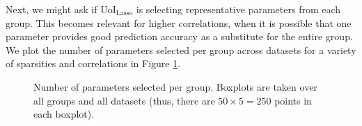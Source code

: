 \documentclass[11pt]{article}
\begin{document}
Next, we might ask if UoI$_{\text{Lasso}}$ is selecting representative parameters from each group. This becomes relevant for higher correlations, when it is possible that one parameter provides good prediction accuracy as a substitute for the entire group. We plot the number of parameters selected per group across datasets for a variety of sparsities and correlations in Figure \ref{fig:exp2-n-per-group}.
\begin{figure}[H]
	\centering
	\caption{Number of parameters selected per group. Boxplots are taken over all groups and all datasets (thus, there are $50\times 5=250$ points in each boxplot).}
	\label{fig:exp2-n-per-group}
\end{figure}
\end{document}
